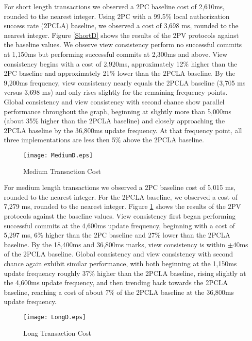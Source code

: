 \documentclass[11pt]{article}
\begin{document}
For short length transactions we observed a 2PC baseline cost of 2,610ms, rounded to the nearest integer. Using 2PC with a 99.5\% local authorization success rate (2PCLA) baseline, we observed a cost of 3,698 ms, rounded to the nearest integer. Figure \ref{ShortD} shows the results of the 2PV protocols against the baseline values. We observe view consistency perform no successful commits at 1,150ms but performing successful commits at 2,300ms and above. View consistency begins with a cost of 2,920ms, approximately 12\% higher than the 2PC baseline and approximately 21\% lower than the 2PCLA baseline. By the 9,200ms frequency, view consistency nearly equals the 2PCLA baseline (3,705 ms versus 3,698 ms) and only rises slightly for the remaining frequency points. Global consistency and view consistency with second chance show parallel performance throughout the graph, beginning at slightly more than 5,000ms (about 35\% higher than the 2PCLA baseline) and closely approaching the 2PCLA baseline by the 36,800ms update frequency. At that frequency point, all three implementations are less then 5\% above the 2PCLA baseline.
\begin{figure}[h]
\begin{center}
\texttt{[image: MediumD.eps]}
\caption{Medium Transaction Cost}
\label{MediumD}
\end{center}
\end{figure}

For medium length transactions we observed a 2PC baseline cost of 5,015 ms, rounded to the nearest integer. For the 2PCLA baseline, we observed a cost of 7,279 ms, rounded to the nearest integer. Figure \ref{MediumD} shows the results of the 2PV protocols against the baseline values. View consistency first began performing successful commits at the 4,600ms update frequency, beginning with a cost of 5,297 ms, 6\% higher than the 2PC baseline and 27\% lower than the 2PCLA baseline. By the 18,400ms and 36,800ms marks, view consistency is within $\pm$40ms of the 2PCLA baseline. Global consistency and view consistency with second chance again exhibit similar performance, with both beginning at the 1,150ms update frequency roughly 37\% higher than the 2PCLA baseline, rising slightly at the 4,600ms update frequency, and then trending back towards the 2PCLA baseline, reaching a cost of about 7\% of the 2PCLA baseline at the 36,800ms update frequency.
\begin{figure}[h]
\begin{center}
\texttt{[image: LongD.eps]}
\caption{Long Transaction Cost}
\label{LongD}
\end{center}
\end{figure}
\end{document}
